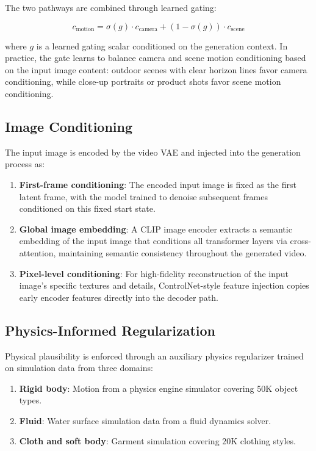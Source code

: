 \documentclass[11pt,a4paper]{article}
\begin{document}
The two pathways are combined through learned gating:

\begin{equation}
  c_{\text{motion}} = \sigma(g) \cdot c_{\text{camera}} + (1 - \sigma(g)) \cdot c_{\text{scene}}
\end{equation}

where $g$ is a learned gating scalar conditioned on the generation context. In practice, the gate learns to balance camera and scene motion conditioning based on the input image content: outdoor scenes with clear horizon lines favor camera conditioning, while close-up portraits or product shots favor scene motion conditioning.

\subsection{Image Conditioning}

The input image is encoded by the video VAE and injected into the generation process as:

\begin{enumerate}
  \item \textbf{First-frame conditioning}: The encoded input image is fixed as the first latent frame, with the model trained to denoise subsequent frames conditioned on this fixed start state.
  \item \textbf{Global image embedding}: A CLIP image encoder extracts a semantic embedding of the input image that conditions all transformer layers via cross-attention, maintaining semantic consistency throughout the generated video.
  \item \textbf{Pixel-level conditioning}: For high-fidelity reconstruction of the input image's specific textures and details, ControlNet-style feature injection \cite{controlnet} copies early encoder features directly into the decoder path.
\end{enumerate}

\subsection{Physics-Informed Regularization}

Physical plausibility is enforced through an auxiliary physics regularizer trained on simulation data from three domains:

\begin{enumerate}
  \item \textbf{Rigid body}: Motion from a physics engine simulator covering 50K object types.
  \item \textbf{Fluid}: Water surface simulation data from a fluid dynamics solver.
  \item \textbf{Cloth and soft body}: Garment simulation covering 20K clothing styles.
\end{enumerate}
\end{document}

